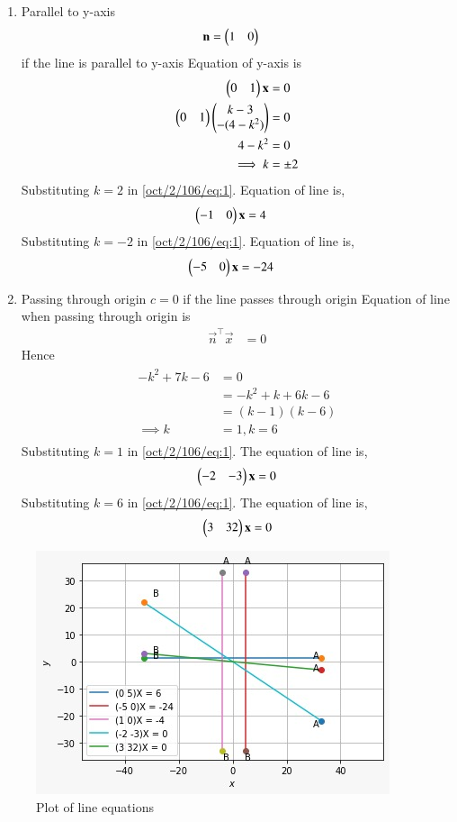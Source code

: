 \begin{enumerate}[label=\emph{\alph*)}]
\item Parallel to y-axis
 \begin{align}\mathbf{n} & =\begin{pmatrix}1 & 0\end{pmatrix} \end{align} if the line is parallel to y-axis Equation of y-axis is  \begin{align}\begin{split}\begin{pmatrix}0 & 1\end{pmatrix}\mathbf{x} & =0\\
\begin{pmatrix}0 & 1\end{pmatrix}\begin{pmatrix}k-3\\-(4-k^2)\end{pmatrix} & = 0\\ \label{oct/2/106/eq1}
 4-k^2 & =0\\
 \implies k & =\pm2
\end{split}
\end{align}
Substituting $k=2$ in \eqref{oct/2/106/eq:1}.
Equation of line is,
\begin{align}
     \begin{pmatrix}-1 & 0\end{pmatrix}\mathbf{x} & = 4
\end{align}
Substituting $k=-2$ in \eqref{oct/2/106/eq:1}.
Equation of line is,
\begin{align}
  \begin{pmatrix}-5 & 0\end{pmatrix}\mathbf{x} & =-24
\end{align}
\item Passing through origin 
${c = 0}$ if the line passes through origin
Equation of line when passing through origin is 
\begin{align}
\vec{n}^\top\vec{x} & =0
\end{align}
Hence
\begin{align} \label{oct/2/106/eq1}
\begin{split}
-k^2+7k-6 & = 0\\
 & = -k^2+k+6k-6\\
 & =(k-1)(k-6)\\
\implies k&=1, k=6
\end{split}
\end{align}
Substituting $k=1$ in \eqref{oct/2/106/eq:1}.
The equation of line is,
\begin{align}
\begin{pmatrix}-2&-3\end{pmatrix}\mathbf{x} = 0
\end{align}
Substituting $k=6$ in \eqref{oct/2/106/eq:1}.
The equation of line is,
\begin{align}
  \begin{pmatrix}3 & 32\end{pmatrix}\mathbf{x} = 0
\end{align}
\end{enumerate}
\begin{figure}[!h]
         \centering
         \includegraphics[width=\columnwidth]{solutions/oct/2/106/figure L.jpeg}
         \caption{Plot of line equations}
         \label{oct/2/106/fig:x cubed graph}
\end{figure}

